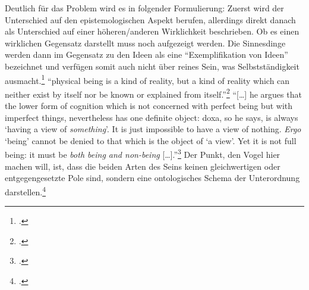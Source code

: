 Deutlich für das Problem wird es in folgender Formulierung:  Zuerst wird der Unterschied auf den epistemologischen Aspekt berufen, allerdings direkt danach als Unterschied auf einer höheren/anderen Wirklichkeit beschrieben. Ob es einen wirklichen Gegensatz darstellt muss noch aufgezeigt werden.
Die Sinnesdinge werden dann im Gegensatz zu den Ideen als eine \enquote{Exemplifikation von Ideen} bezeichnet und verfügen somit auch nicht über reines Sein, was Selbstständigkeit ausmacht.\footcite[vgl.][S. 146]{GraeserPhiloGeschichte}
\enquote{physical being is a kind of reality, but a kind of reality which can neither exist by itself nor be known or explained from itself.}\footcite[][S. 162]{Vogel}
\enquote{[\dots] he argues that the lower form of cognition which is not concerned with perfect being but with imperfect things, nevertheless has one definite object: doxa, so he says, is always \enquote{having a view of \emph{something}}. It is just impossible to have a view of nothing. \emph{Ergo} \enquote{being} cannot be denied to that which is the object of \enquote{a view}. Yet it is not full being: it must be \emph{both being and non-being} [\dots].}\footcite[vgl.][S. 165]{Vogel}
Der Punkt, den Vogel hier machen will, ist, dass die beiden Arten des Seins keinen gleichwertigen oder entgegengesetzte Pole sind, sondern eine ontologisches Schema der Unterordnung darstellen.\footcite[vgl.][S. 165]{Vogel}\\
